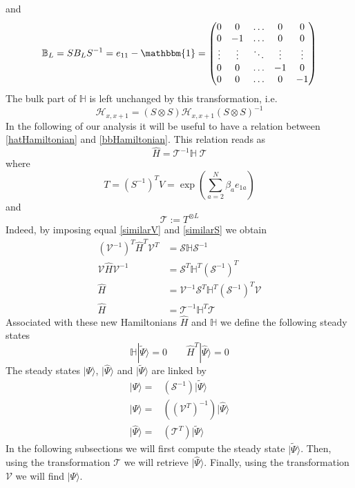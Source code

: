 \documentclass[11pt]{article}
\numberwithin{equation}{section}
\numberwithin{equation}{subsection}
\begin{document}
and 
\begin{equation}
    \mathbb{B}_{L}=SB_{L}S^{-1}=e_{11}-\mathbbm{1}=\begin{pmatrix}
		0&0&\ldots&0&0\\
		0&-1&\ldots&0&0\\
		\vdots&\vdots&\ddots&\vdots&\vdots\\
		0&0&\ldots&-1&0\\
		0&0&\ldots&0&-1
  \end{pmatrix}
\end{equation}
The bulk part of $\mathbb{H}$ is left unchanged by this transformation, i.e.
\begin{equation}
    \mathcal{H}_{x,x+1}=\left(S\otimes S\right)\mathcal{H}_{x,x+1}\left(S\otimes S\right)^{-1}
\end{equation}
In the following of our analysis it will be useful to have a relation between \eqref{hatHamiltonian} and \eqref{bbHamiltonian}. This relation reads as
\begin{equation}
    \widehat{H}=\mathcal{T}^{-1}\mathbb{H}\;\mathcal{T}
\end{equation}
where
\begin{equation}
    T=\left(S^{-1}\right)^{T}V=\exp{\left(\sum_{a=2}^{N}\beta_{a}e_{1a}\right)}
\end{equation}
and 
\begin{equation}
    \mathcal{T}:=T^{\otimes L}
\end{equation}
Indeed, by imposing equal \eqref{similarV} and \eqref{similarS} we obtain 
\begin{align*}
    		\left(\mathcal{V}^{-1}\right)^{T}\widehat{H}^{T}\mathcal{V}^{T}&=\mathcal{S}\mathbb{H}\mathcal{S}^{-1}\\
		\mathcal{V}\widehat{H}\mathcal{V}^{-1}&=\mathcal{S}^{T}\mathbb{H}^{T}\left(\mathcal{S}^{-1}\right)^{T}\\
		\widehat{H}&=\mathcal{V}^{-1}\mathcal{S}^{T}\mathbb{H}^{T}\left(\mathcal{S}^{-1}\right)^{T}\mathcal{V}\\
		\widehat{H}&=\mathcal{T}^{-1}\mathbb{H}^{T}\mathcal{T}
\end{align*}
Associated with these new Hamiltonians $\widehat{H}$ and $\mathbb{H}$ we define the following steady states
\begin{equation}
	\mathbb{H}|\widetilde{\Psi}\rangle=0\qquad \widehat{H}^{T}|\widehat{\Psi}\rangle=0
\end{equation}
The steady states $|\Psi\rangle$, $|\widehat{\Psi}\rangle$ and $|\widetilde{\Psi}\rangle$ are linked by 
\begin{align}
	|\Psi\rangle=&\left(\mathcal{S}^{-1}\right)|\widetilde{\Psi}\rangle\label{SteadystateTilde}
 \\|\Psi\rangle =&\left((\mathcal{{V}}^{T})^{-1}\right)|\widehat{\Psi}\rangle \label{SteadystateHat}
 \\|\widehat{\Psi}\rangle=&\left(\mathcal{T}^{T}\right)|\widetilde{\Psi}\rangle\label{SteadyStateHatTilde}
\end{align}
In the following subsections we will first compute the steady state $|\widetilde{\Psi}\rangle$. Then, using the transformation $\mathcal{T}$ we will retrieve $|\widehat{\Psi}\rangle$. Finally, using the transformation $\mathcal{V}$ we will find $|\Psi\rangle$. 
\end{document}
